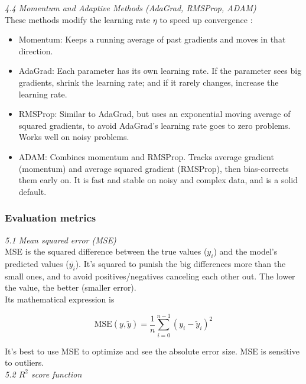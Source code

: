 \documentclass[amssymb,twocolumn,aps,floatfix]{revtex4-2}
\begin{document}
\textit{4.4 Momentum and Adaptive Methods (AdaGrad, RMSProp, ADAM) } \\

These methods modify the learning rate $\eta$ to speed up convergence \cite{hjorthjensen_optimization_notes_misc}: 

\begin{itemize}
    \item Momentum: Keeps a running average of past gradients and moves in that direction. 
    \item AdaGrad: Each parameter has its own learning rate. If the parameter sees big gradients, shrink the learning rate; and if it rarely changes, increase the learning rate. 
    \item RMSProp: Similar to AdaGrad, but uses an exponential moving average of squared gradients, to avoid AdaGrad's learning rate goes to zero problems. Works well on noisy problems.
    \item ADAM: Combines momentum and RMSProp. Tracks average gradient (momentum) and average squared gradient (RMSProp), then bias-corrects them early on. It is fast and stable on noisy and complex data, and is a solid default.
\end{itemize}

\subsubsection{Evaluation metrics}
\label{subsubsec:eval_theory}

\textit{5.1 Mean squared error (MSE)} \\

MSE is the squared difference between the true values ($y_i$) and the model's predicted values ($\overline{y_i}$). It's squared to punish the big differences more than the small ones, and to avoid positives/negatives canceling each other out. The lower the value, the better (smaller error). \\

Its mathematical expression is 

\begin{equation}
    \text{MSE}(y, \tilde{y}) = \frac{1}{n} \sum_{i=0}^{n-1} (y_i - \tilde{y}_i)^2 
\end{equation}

It's best to use MSE to optimize and see the absolute error size. MSE is sensitive to outliers. \\

\textit{5.2 $R^2$ score function} \\
\end{document}

